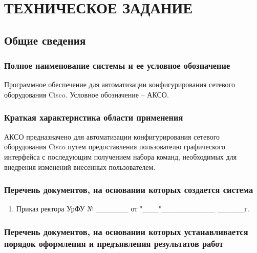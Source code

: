 	\chapter{ТЕХНИЧЕСКОЕ ЗАДАНИЕ}
	
	\section{Общие сведения}
	
	\subsection{Полное наименование системы и ее условное обозначение}
	
	Программное обеспечение для автоматизации конфигурирования сетевого оборудования Cisco. Условное обозначение – АКСО\cite{gost-34602}.
	
	\subsection{Краткая характеристика области применения}
	
	АКСО предназначено для автоматизации конфигурирования сетевого оборудования Cisco путем предоставления пользователю графического интерфейса с последующим получением набора команд, необходимых для внедрения изменений внесенных пользователем.
	
	\subsection{Перечень документов, на основании которых создается система}
	
	\begin{enumerate}
		\item Приказ ректора УрФУ № \_\_\_\_\_\_ от "\_\_\_"\_\_\_\_\_\_\_\_\_\_ \_\_\_\_\_г.
	\end{enumerate}
		
	\subsection{Перечень документов, на основании которых устанавливается порядок оформления и предъявления результатов работ}
	
